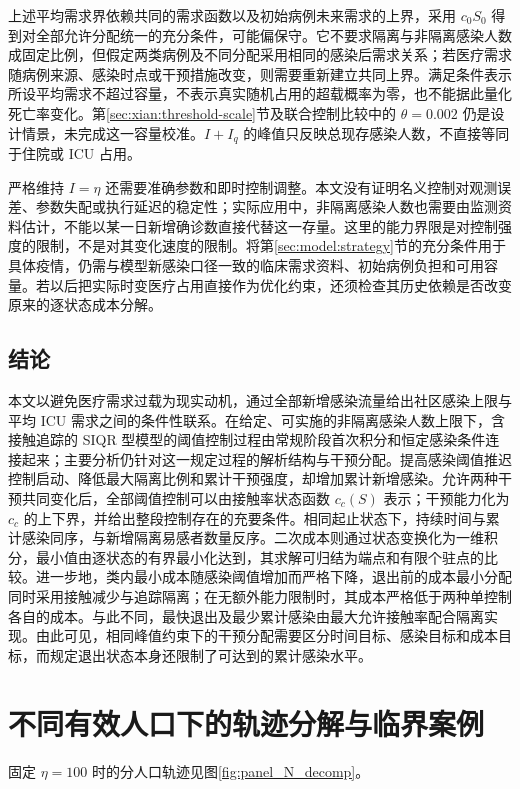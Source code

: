 \documentclass[lang=cn,a4paper,newtx]{elegantpaper}
\numberwithin{equation}{section}
\theoremstyle{plain}
\begin{document}
上述平均需求界依赖共同的需求函数以及初始病例未来需求的上界，采用 $c_0S_0$ 得到对全部允许分配统一的充分条件，可能偏保守。它不要求隔离与非隔离感染人数成固定比例，但假定两类病例及不同分配采用相同的感染后需求关系；若医疗需求随病例来源、感染时点或干预措施改变，则需要重新建立共同上界。满足条件表示所设平均需求不超过容量，不表示真实随机占用的超载概率为零，也不能据此量化死亡率变化。第\ref{sec:xian:threshold-scale}节及联合控制比较中的 $\theta=0.002$ 仍是设计情景，未完成这一容量校准。$I+I_q$ 的峰值只反映总现存感染人数，不直接等同于住院或 ICU 占用。

严格维持 $I=\eta$ 还需要准确参数和即时控制调整。本文没有证明名义控制对观测误差、参数失配或执行延迟的稳定性；实际应用中，非隔离感染人数也需要由监测资料估计，不能以某一日新增确诊数直接代替这一存量。这里的能力界限是对控制强度的限制，不是对其变化速度的限制。将第\ref{sec:model:strategy}节的充分条件用于具体疫情，仍需与模型新感染口径一致的临床需求资料、初始病例负担和可用容量。若以后把实际时变医疗占用直接作为优化约束，还须检查其历史依赖是否改变原来的逐状态成本分解。

\subsection{结论}
本文以避免医疗需求过载为现实动机，通过全部新增感染流量给出社区感染上限与平均 ICU 需求之间的条件性联系。在给定、可实施的非隔离感染人数上限下，含接触追踪的 SIQR 型模型的阈值控制过程由常规阶段首次积分和恒定感染条件连接起来；主要分析仍针对这一规定过程的解析结构与干预分配。提高感染阈值推迟控制启动、降低最大隔离比例和累计干预强度，却增加累计新增感染。允许两种干预共同变化后，全部阈值控制可以由接触率状态函数 $c_c(S)$ 表示；干预能力化为 $c_c$ 的上下界，并给出整段控制存在的充要条件。相同起止状态下，持续时间与累计感染同序，与新增隔离易感者数量反序。二次成本则通过状态变换化为一维积分，最小值由逐状态的有界最小化达到，其求解可归结为端点和有限个驻点的比较。进一步地，类内最小成本随感染阈值增加而严格下降，退出前的成本最小分配同时采用接触减少与追踪隔离；在无额外能力限制时，其成本严格低于两种单控制各自的成本。与此不同，最快退出及最少累计感染由最大允许接触率配合隔离实现。由此可见，相同峰值约束下的干预分配需要区分时间目标、感染目标和成本目标，而规定退出状态本身还限制了可达到的累计感染水平。


\FloatBarrier

\appendix
\section{不同有效人口下的轨迹分解与临界案例}
\label{app:panel_eta_N}
固定 $\eta=100$ 时的分人口轨迹见图\ref{fig:panel_N_decomp}。
\end{document}
